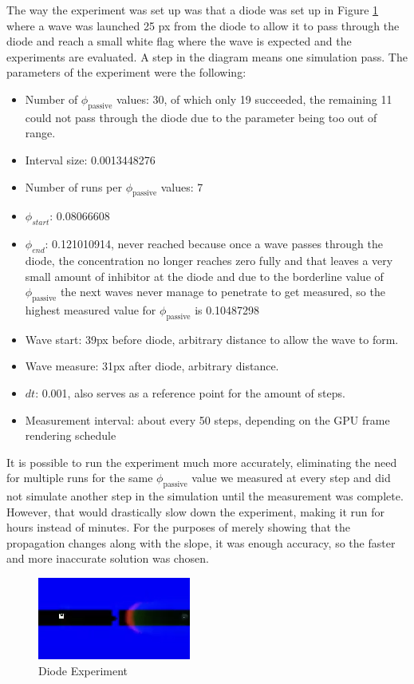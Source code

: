 The way the experiment was set up was that a diode was set up in Figure \ref{fig:diode_experiment} where a wave was launched 25 px from the diode to allow it to pass through the diode and reach a small white flag where the wave is expected and the experiments are evaluated. A step in the diagram means one simulation pass. The parameters of the experiment were the following:
\begin{itemize}
    \item Number of $\phi_{\text{passive}}$ values: 30, of which only 19 succeeded, the remaining 11 could not pass through the diode due to the parameter being too out of range.
    \item Interval size: 0.0013448276
    \item Number of runs per $\phi_{\text{passive}}$ values: 7
    \item $\phi_{start}$: 0.08066608
    \item $\phi_{end}$: 0.121010914, never reached because once a wave passes through the diode, the concentration no longer reaches zero fully and that leaves a very small amount of inhibitor at the diode and due to the borderline value of $\phi_{\text{passive}}$ the next waves never manage to penetrate to get measured, so the highest measured value for $\phi_{\text{passive}}$ is 0.10487298
    \item Wave start: 39px before diode, arbitrary distance to allow the wave to form.
    \item Wave measure: 31px after diode, arbitrary distance.
    \item $dt$: 0.001, also serves as a reference point for the amount of steps.
    \item Measurement interval: about every 50 steps, depending on the GPU frame rendering schedule
\end{itemize}

It is possible to run the experiment much more accurately, eliminating the need for multiple runs for the same $\phi_{\text{passive}}$ value we measured at every step and did not simulate another step in the simulation until the measurement was complete. However, that would drastically slow down the experiment, making it run for hours instead of minutes. For the purposes of merely showing that the propagation changes along with the slope, it was enough accuracy, so the faster and more inaccurate solution was chosen.

\begin{figure}
    \centering
    \includegraphics[width=0.5\linewidth]{diode.png}
    \caption{Diode Experiment}
    \label{fig:diode_experiment}
\end{figure}

